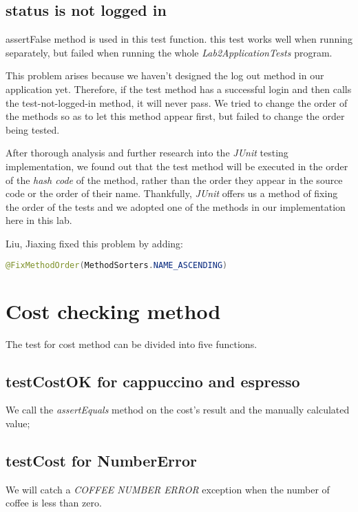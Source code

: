 \documentclass[a4paper]{report}
\begin{document}
\subsection{status is not logged in}
\par assertFalse method is used in this test function.
this test works well when running separately, but failed when running the whole \emph{Lab2ApplicationTests} program.
\par
This problem arises because we haven't designed the log out method in our application yet. Therefore, if the test method has a successful login and then calls the test-not-logged-in method, it will never pass. We tried to change the order of the methods so as to let this method appear first, but failed to change the order being tested. 
\par
After thorough analysis and further research into the \emph{JUnit} testing implementation, we found out that the test method will be executed in the order of the \emph{hash code} of the method, rather than the order they appear in the source code or the order of their name. Thankfully, \emph{JUnit} offers us a method of fixing the order of the tests and we adopted one of the methods in our implementation here in this lab.
\par
Liu, Jiaxing fixed this problem by adding:
\begin{lstlisting}[language=java]
@FixMethodOrder(MethodSorters.NAME_ASCENDING)
\end{lstlisting}
\section{Cost checking method}
\par The test for cost method can be divided into five functions.

\subsection{testCostOK for cappuccino and espresso}
\par We call the \emph{assertEquals} method on the cost's result and the manually calculated value;

\subsection{testCost for NumberError}
\par We will catch a \emph{COFFEE NUMBER ERROR} exception when the number of coffee is less than zero.
\end{document}
